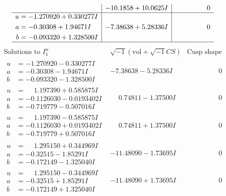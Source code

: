 \documentclass[1p]{elsarticle_modified}
\theoremstyle{definition}
\newcommand{\I}{\sqrt{-1}}
\begin{document}
$$\begin{array}{c|c|c}
 & -10.1858 + 10.0625 I & \phantom{-0.000000 } 0 \\ \hline\begin{aligned}
u &= -1.270920 + 0.330277 I \\
a &= -0.30308 + 1.94671 I \\
b &= -0.093320 + 1.328500 I\end{aligned}
 & -7.38638 + 5.28336 I & \phantom{-0.000000 } 0\\
 \hline 
 \end{array}$$\newpage$$\begin{array}{c|c|c}  
\text{Solutions to }I^u_{1}& \I (\text{vol} + \sqrt{-1}CS) & \text{Cusp shape}\\
 \hline 
\begin{aligned}
u &= -1.270920 - 0.330277 I \\
a &= -0.30308 - 1.94671 I \\
b &= -0.093320 - 1.328500 I\end{aligned}
 & -7.38638 - 5.28336 I & \phantom{-0.000000 } 0 \\ \hline\begin{aligned}
u &= \phantom{-}1.197390 + 0.585875 I \\
a &= -0.1126030 - 0.0193402 I \\
b &= -0.719779 - 0.507016 I\end{aligned}
 & \phantom{-}0.74811 - 1.37500 I & \phantom{-0.000000 } 0 \\ \hline\begin{aligned}
u &= \phantom{-}1.197390 - 0.585875 I \\
a &= -0.1126030 + 0.0193402 I \\
b &= -0.719779 + 0.507016 I\end{aligned}
 & \phantom{-}0.74811 + 1.37500 I & \phantom{-0.000000 } 0 \\ \hline\begin{aligned}
u &= \phantom{-}1.295150 + 0.344969 I \\
a &= -0.32515 - 1.85291 I \\
b &= -0.172149 - 1.325040 I\end{aligned}
 & -11.48090 - 1.73695 I & \phantom{-0.000000 } 0 \\ \hline\begin{aligned}
u &= \phantom{-}1.295150 - 0.344969 I \\
a &= -0.32515 + 1.85291 I \\
b &= -0.172149 + 1.325040 I\end{aligned}
 & -11.48090 + 1.73695 I & \phantom{-0.000000 } 0 \\ \hline\begin{aligned}

\end{aligned}
\end{array}$$
\end{document}
